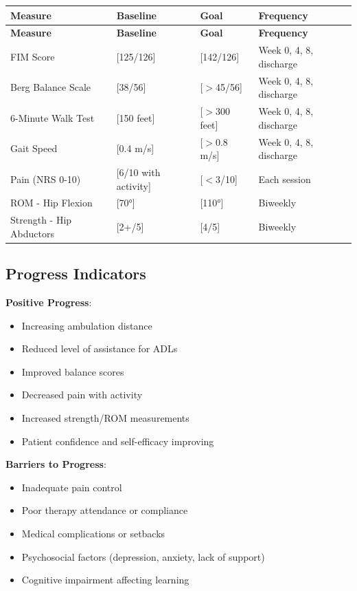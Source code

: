 \documentclass[11pt,letterpaper]{article}
\begin{document}
\begin{longtable}{|p{4.5cm}|p{3cm}|p{3cm}|p{3cm}|}
\hline
\textbf{Measure} & \textbf{Baseline} & \textbf{Goal} & \textbf{Frequency} \\ \hline
\endfirsthead
\hline
\textbf{Measure} & \textbf{Baseline} & \textbf{Goal} & \textbf{Frequency} \\ \hline
\endhead
FIM Score & [125/126] & [142/126] & Week 0, 4, 8, discharge \\ \hline
Berg Balance Scale & [38/56] & [$>$45/56] & Week 0, 4, 8, discharge \\ \hline
6-Minute Walk Test & [150 feet] & [$>$300 feet] & Week 0, 4, 8, discharge \\ \hline
Gait Speed & [0.4 m/s] & [$>$0.8 m/s] & Week 0, 4, 8, discharge \\ \hline
Pain (NRS 0-10) & [6/10 with activity] & [$<$3/10] & Each session \\ \hline
ROM - Hip Flexion & [70°] & [110°] & Biweekly \\ \hline
Strength - Hip Abductors & [2+/5] & [4/5] & Biweekly \\ \hline
\end{longtable}

\subsection*{Progress Indicators}

\textbf{Positive Progress}:
\begin{itemize}[leftmargin=*]
    \item Increasing ambulation distance
    \item Reduced level of assistance for ADLs
    \item Improved balance scores
    \item Decreased pain with activity
    \item Increased strength/ROM measurements
    \item Patient confidence and self-efficacy improving
\end{itemize}

\textbf{Barriers to Progress}:
\begin{itemize}[leftmargin=*]
    \item Inadequate pain control
    \item Poor therapy attendance or compliance
    \item Medical complications or setbacks
    \item Psychosocial factors (depression, anxiety, lack of support)
    \item Cognitive impairment affecting learning
\end{itemize}
\end{document}
